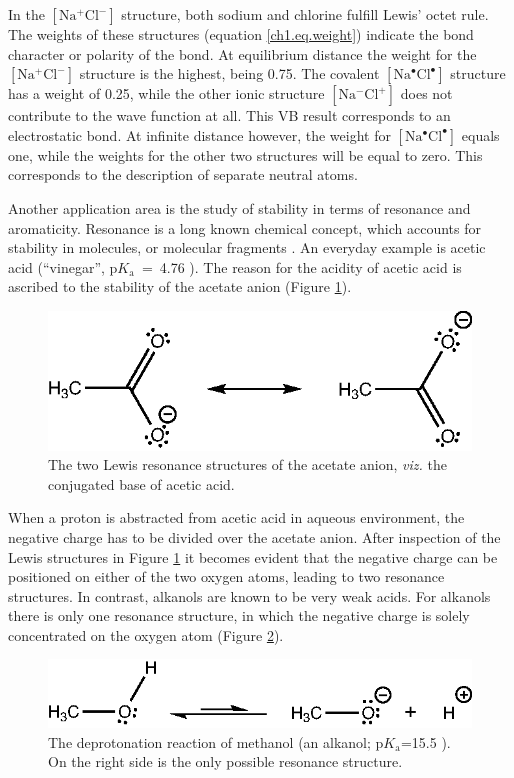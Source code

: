 In the $\mathrm{[Na^{+} Cl^{-}]}$ structure, both sodium and chlorine fulfill Lewis' octet rule. The weights of these structures (equation \ref{ch1.eq.weight}) indicate the bond character or polarity of the bond. At equilibrium distance the weight for the $\mathrm{[Na^{+} Cl^{-}]}$ structure is the highest, being 0.75. The covalent $\mathrm{[Na^\bullet Cl^\bullet]}$ structure has a weight of 0.25, while the other ionic structure $\mathrm{[Na^{-} Cl^{+}]}$ does not contribute to the wave function at all. This VB result corresponds to an electrostatic bond. At infinite distance however, the weight for \mbox{$\mathrm{[Na^\bullet Cl^\bullet]}$} equals one, while the weights for the other two structures will be equal to zero. This corresponds to the description of separate neutral atoms.

Another application area is the study of stability in terms of resonance and aromaticity. Resonance is a long known chemical concept, which accounts for stability in molecules, or molecular fragments \cite{whelandbook}. An everyday example is acetic acid (``vinegar'', p$K_\mathrm{a}$~=~4.76 \cite{bruice}). The reason for the acidity of acetic acid is ascribed to the stability of the acetate anion (Figure \ref{ch1.fig.acetic}).
\begin{figure}[htp]
\center
\includegraphics{introduction/figures/acetic.eps}
\caption{The two Lewis resonance structures of the acetate anion, \textit{viz.} the conjugated base of acetic acid.}
\label{ch1.fig.acetic}
\end{figure}
When a proton is abstracted from acetic acid in aqueous environment, the negative charge has to be divided over the acetate anion. After inspection of the Lewis structures in Figure \ref{ch1.fig.acetic} it becomes evident that the negative charge can be positioned on either of the two oxygen atoms, leading to two resonance structures. In contrast, alkanols are known to be very weak acids. For alkanols there is only one resonance structure, in which the negative charge is solely concentrated on the oxygen atom (Figure \ref{ch1.fig.alcohol}).
\begin{figure}[htp]
\center
\includegraphics{introduction/figures/alcohol.eps}
\caption{The deprotonation reaction of methanol (an alkanol; p$K_\mathrm{a}$=15.5 \cite{bruice}). On the right side is the only possible resonance structure.}
\label{ch1.fig.alcohol}
\end{figure}
